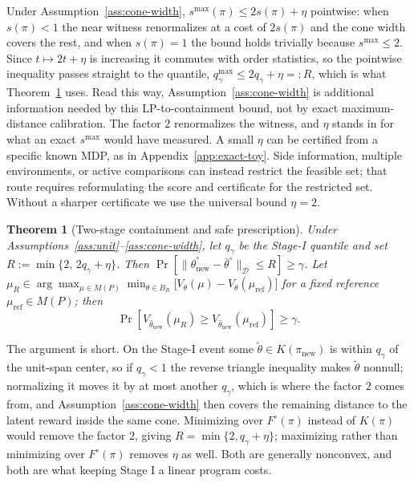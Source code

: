 \documentclass{article}
\newtheorem{theorem}{Theorem}
\newcommand{\Dnorm}[1]{\|#1\|_{\mathcal D}}
\begin{document}
Under Assumption~\ref{ass:cone-width}, $s^{\max}(\pi)\le2s(\pi)+\eta$
pointwise: when $s(\pi)<1$ the near witness renormalizes at a cost of
$2s(\pi)$ and the cone width covers the rest, and when $s(\pi)=1$ the bound
holds trivially because $s^{\max}\le2$. Since $t\mapsto2t+\eta$ is increasing
it commutes with order statistics, so the pointwise inequality passes straight
to the quantile, $q^{\max}_\gamma\le2q_\gamma+\eta=:R$, which is what
Theorem~\ref{thm:containment} uses. Read this way,
Assumption~\ref{ass:cone-width} is additional information needed by this
LP-to-containment bound, not by exact maximum-distance calibration.
The factor $2$ renormalizes the witness, and $\eta$ stands in for what an exact
$s^{\max}$ would have measured. A small $\eta$ can be certified from a specific
known MDP, as in Appendix~\ref{app:exact-toy}. Side information, multiple
environments, or active comparisons can instead restrict the feasible set;
that route requires reformulating the score and certificate for the restricted
set. Without a sharper certificate we use the universal bound $\eta=2$.

\begin{theorem}[Two-stage containment and safe prescription]
\label{thm:containment}
Under Assumptions~\ref{ass:unit}--\ref{ass:cone-width}, let $q_\gamma$ be the
Stage-I quantile and set $R:=\min\{2,\,2q_\gamma+\eta\}$. Then
$\Pr[\Dnorm{\hat\theta_{\mathrm{new}}^\circ-\bar\theta^\circ}\le R]\ge\gamma$.
Let $\mu_R\in\arg\max_{\mu\in M(P)}\min_{\theta\in B_R}\big[V_\theta(\mu)
-V_\theta(\mu_{\mathrm{ref}})\big]$ for a fixed reference
$\mu_{\mathrm{ref}}\in M(P)$; then
\[
\Pr\!\left[V_{\hat\theta_{\mathrm{new}}}(\mu_R)
\ge V_{\hat\theta_{\mathrm{new}}}(\mu_{\mathrm{ref}})\right]\ge\gamma .
\]
\end{theorem}

The argument is short. On the Stage-I event some
$\tilde\theta\in K(\pi_{\mathrm{new}})$ is within $q_\gamma$ of the unit-span
center, so if $q_\gamma<1$ the reverse triangle inequality makes $\tilde\theta$
nonnull; normalizing it moves it by at most another $q_\gamma$, which is where
the factor $2$ comes from, and Assumption~\ref{ass:cone-width} then covers the
remaining distance to the latent reward inside the same cone. Minimizing over
$F^\circ(\pi)$ instead of $K(\pi)$ would remove the factor $2$, giving
$R=\min\{2,q_\gamma+\eta\}$; maximizing rather than minimizing over
$F^\circ(\pi)$ removes $\eta$ as well. Both are generally nonconvex, and both are what
keeping Stage I a linear program costs.
\end{document}
